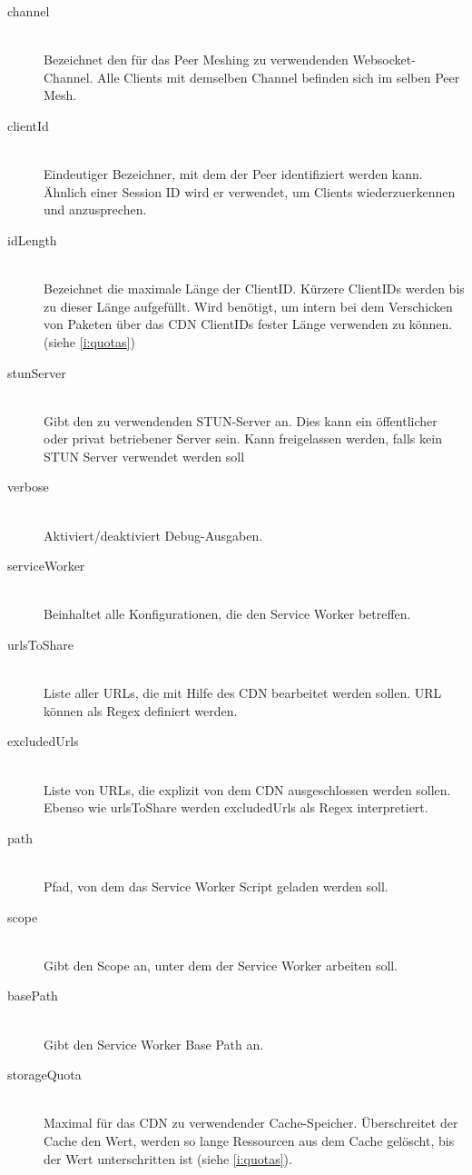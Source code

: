 \begin{description}
\begin{description}
\item[channel]\hfill \\
Bezeichnet den für das Peer Meshing zu verwendenden Websocket-Channel. Alle Clients mit demselben Channel befinden sich im selben Peer Mesh.
\item[clientId]\hfill \\
Eindeutiger Bezeichner, mit dem der Peer identifiziert werden kann. Ähnlich einer Session ID wird er verwendet, um Clients wiederzuerkennen und anzusprechen.
\item[idLength]\hfill \\
Bezeichnet die maximale Länge der ClientID. Kürzere ClientIDs werden bis zu dieser Länge aufgefüllt. Wird benötigt, um intern bei dem Verschicken von Paketen über das CDN ClientIDs fester Länge verwenden zu können.(siehe \ref{i:quotas}) 
\item[stunServer]\hfill \\
Gibt den zu verwendenden STUN-Server an. Dies kann ein öffentlicher oder privat betriebener Server sein. Kann freigelassen werden, falls kein STUN Server verwendet werden soll
\item[verbose]\hfill \\
Aktiviert/deaktiviert Debug-Ausgaben.
\item[serviceWorker]\hfill \\
Beinhaltet alle Konfigurationen, die den Service Worker betreffen.
\item[urlsToShare]\hfill \\
Liste aller URLs, die mit Hilfe des CDN bearbeitet werden sollen. URL können als Regex definiert werden.
\item[excludedUrls]\hfill \\
Liste von URLs, die explizit von dem CDN ausgeschlossen werden sollen. Ebenso wie urlsToShare werden excludedUrls als Regex interpretiert.
\item[path]\hfill \\
Pfad, von dem das Service Worker Script geladen werden soll.
\item[scope]\hfill \\
Gibt den Scope an, unter dem der Service Worker arbeiten soll. 
\item[basePath]\hfill \\
Gibt den Service Worker Base Path an.
\item[storageQuota]\hfill \\
Maximal für das CDN zu verwendender Cache-Speicher. Überschreitet der Cache den Wert, werden so lange Ressourcen aus dem Cache gelöscht, bis der Wert unterschritten ist (siehe \ref{i:quotas}). 

\end{description}
\end{description}
